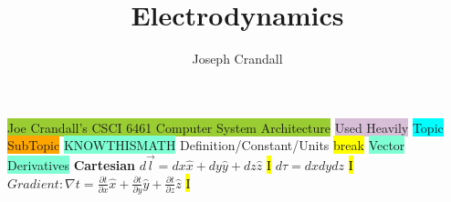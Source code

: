 \documentclass[fontsize=4pt]{scrartcl}
\title{Electrodynamics}
\author{Joseph Crandall}
\begin{document}

\colorbox{YellowGreen}{Joe Crandall's CSCI 6461 Computer System Architecture}
\colorbox{Thistle}{Used Heavily}
\colorbox{Cyan}{Topic}
\colorbox{Orange}{SubTopic}
\colorbox{Aquamarine}{KNOWTHISMATH}
\colorbox{RubineRed}{Definition/Constant/Units}
\colorbox{Yellow}{break}
\colorbox{Aquamarine}{Vector Derivatives}
\textbf{Cartesian}
$d\vec{l} = dx\hat{x} + dy\hat{y} + dz\hat{z}$
\hl{I}
$d \tau = dxdydz$
\hl{I}
$Gradient:  \nabla t =\frac{\partial t}{\partial x}\hat{x} + \frac{\partial t}{\partial y}\hat{y} + \frac{\partial t}{\partial z}\hat{z} $
\hl{I}


\end{document}
